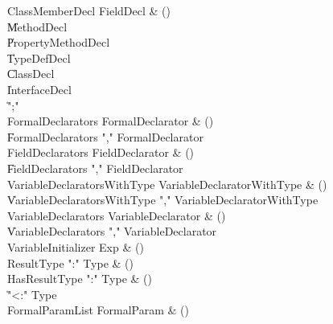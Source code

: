\begin{bbgrammar}
 ClassMemberDecl  \label{prod:ClassMemberDecl}  \: FieldDecl & ()\\
    \| MethodDecl\\
    \| PropertyMethodDecl\\
    \| TypeDefDecl\\
    \| ClassDecl\\
    \| InterfaceDecl\\
    \| \xcd";"\\
 FormalDeclarators  \label{prod:FormalDeclarators}  \: FormalDeclarator & ()\\
    \| FormalDeclarators \xcd"," FormalDeclarator\\
 FieldDeclarators  \label{prod:FieldDeclarators}  \: FieldDeclarator & ()\\
    \| FieldDeclarators \xcd"," FieldDeclarator\\
 VariableDeclaratorsWithType  \label{prod:VariableDeclaratorsWithType}  \: VariableDeclaratorWithType & ()\\
    \| VariableDeclaratorsWithType \xcd"," VariableDeclaratorWithType\\
 VariableDeclarators  \label{prod:VariableDeclarators}  \: VariableDeclarator & ()\\
    \| VariableDeclarators \xcd"," VariableDeclarator\\
 VariableInitializer  \label{prod:VariableInitializer}  \: Exp & ()\\
 ResultType  \label{prod:ResultType}  \: \xcd":" Type & ()\\
 HasResultType  \label{prod:HasResultType}  \: \xcd":" Type & ()\\
    \| \xcd"<:" Type\\
 FormalParamList  \label{prod:FormalParamList}  \: FormalParam & ()\\
\end{bbgrammar}

